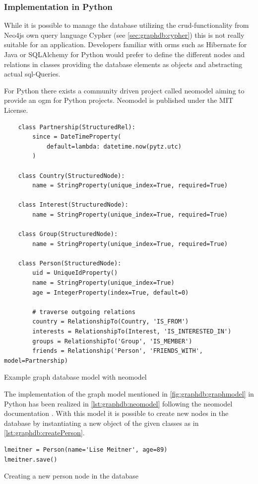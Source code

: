 \subsubsection{Implementation in Python}
While it is possible to manage the database utilizing the \gls{crud}-functionality from Neo4js own query language Cypher (see \ref{sec:graphdb:cypher}) this is not really suitable for an application.
Developers familiar with \glspl{orm} such as Hibernate for Java or SQLAlchemy for Python would prefer to define the different nodes and relations in classes providing the database elements as objects and abstracting actual \gls{sql}-Queries.

For Python there exists a community driven project called neomodel \autocite{github:neomodel} aiming to provide an \gls{ogm} for Python projects. Neomodel is published under the MIT License.

\begin{listing}[ht]
    \begin{verbatim}
    class Partnership(StructuredRel):
        since = DateTimeProperty(
            default=lambda: datetime.now(pytz.utc)
        )

    class Country(StructuredNode):
        name = StringProperty(unique_index=True, required=True)

    class Interest(StructuredNode):
        name = StringProperty(unique_index=True, required=True)

    class Group(StructuredNode):
        name = StringProperty(unique_index=True, required=True)

    class Person(StructuredNode):
        uid = UniqueIdProperty()
        name = StringProperty(unique_index=True)
        age = IntegerProperty(index=True, default=0)

        # traverse outgoing relations
        country = RelationshipTo(Country, 'IS_FROM')
        interests = RelationshipTo(Interest, 'IS_INTERESTED_IN')
        groups = RelationshipTo('Group', 'IS_MEMBER')
        friends = Relationship('Person', 'FRIENDS_WITH', model=Partnership)
    \end{verbatim}
    \caption{Example graph database model with neomodel}
    \label{lst:graphdb:neomodel}
\end{listing}

The implementation of the graph model mentioned in \autoref{fig:graphdb:graphmodel} in Python has been realized in \autoref{lst:graphdb:neomodel} following the neomodel documentation \autocite{neomodel:rtd}. With this model it is possible to create new nodes in the database by instantiating a new object of the given classes as in \autoref{lst:graphdb:createPerson}.
\begin{listing}[H]
\begin{verbatim}
lmeitner = Person(name='Lise Meitner', age=89)
lmeitner.save()
\end{verbatim}
\caption{Creating a new person node in the database}
\label{lst:graphdb:createPerson}
\end{listing}

